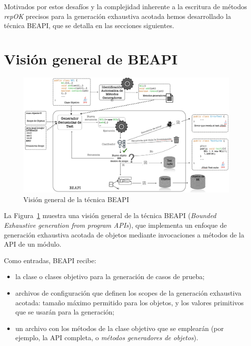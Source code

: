 Motivados por estos desafíos y la complejidad inherente a la escritura de
métodos \emph{repOK} precisos para la generación exhaustiva acotada hemos
desarrollado la técnica BEAPI, que se detalla en las secciones siguientes.


\section{Visión general de BEAPI}
\label{sec:beapi-overview}

\begin{figure}[H]
  \centering
  \includegraphics[width=1.0\textwidth]{images/beapi-arquitecture.jpeg}
  \caption{Visión general de la técnica \textsf{BEAPI}}
  \label{fig:beapi-overview}
\end{figure}

La Figura~\ref{fig:beapi-overview} muestra una visión general de la técnica 
\textsf{BEAPI} (\emph{Bounded Exhaustive generation from program APIs}), que implementa un enfoque 
de generación exhaustiva acotada de objetos mediante invocaciones a métodos de
la API de un módulo. 

Como entradas, \textsf{BEAPI} recibe:
\begin{itemize}
    \item la clase o clases objetivo para la generación de casos de prueba;
    \item archivos de configuración que definen los scopes de la generación
        exhaustiva acotada: tamaño máximo permitido para los objetos, y los valores primitivos 
        que se usarán para la generación;
    \item un archivo con los métodos de la clase objetivo que se emplearán 
        (por ejemplo, la API completa, o \emph{métodos generadores de objetos}).
\end{itemize}

